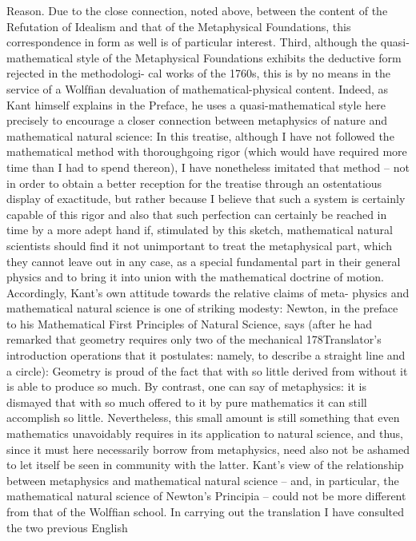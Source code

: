 Reason. Due to the close connection, noted above, between the content
of the Refutation of Idealism and that of the Metaphysical Foundations,
this correspondence in form as well is of particular interest.
Third, although the quasi-mathematical style of the Metaphysical
Foundations exhibits the deductive form rejected in the methodologi-
cal works of the 1760s, this is by no means in the service of a Wolfﬁan
devaluation of mathematical-physical content. Indeed, as Kant himself
explains in the Preface, he uses a quasi-mathematical style here precisely
to encourage a closer connection between metaphysics of nature and
mathematical natural science:
In this treatise, although I have not followed the mathematical method with
thoroughgoing rigor (which would have required more time than I had to spend
thereon), I have nonetheless imitated that method – not in order to obtain a
better reception for the treatise through an ostentatious display of exactitude,
but rather because I believe that such a system is certainly capable of this rigor
and also that such perfection can certainly be reached in time by a more adept
hand if, stimulated by this sketch, mathematical natural scientists should ﬁnd it
not unimportant to treat the metaphysical part, which they cannot leave out in
any case, as a special fundamental part in their general physics and to bring it
into union with the mathematical doctrine of motion.
Accordingly, Kant’s own attitude towards the relative claims of meta-
physics and mathematical natural science is one of striking modesty:
Newton, in the preface to his Mathematical First Principles of Natural Science,
says (after he had remarked that geometry requires only two of the mechanical
178Translator’s introduction
operations that it postulates: namely, to describe a straight line and a circle):
Geometry is proud of the fact that with so little derived from without it is able to produce
so much. By contrast, one can say of metaphysics: it is dismayed that with so much
offered to it by pure mathematics it can still accomplish so little. Nevertheless, this
small amount is still something that even mathematics unavoidably requires in
its application to natural science, and thus, since it must here necessarily borrow
from metaphysics, need also not be ashamed to let itself be seen in community
with the latter.
Kant’s view of the relationship between metaphysics and mathematical
natural science – and, in particular, the mathematical natural science
of Newton’s Principia – could not be more different from that of the
Wolfﬁan school.
In carrying out the translation I have consulted the two previous English
